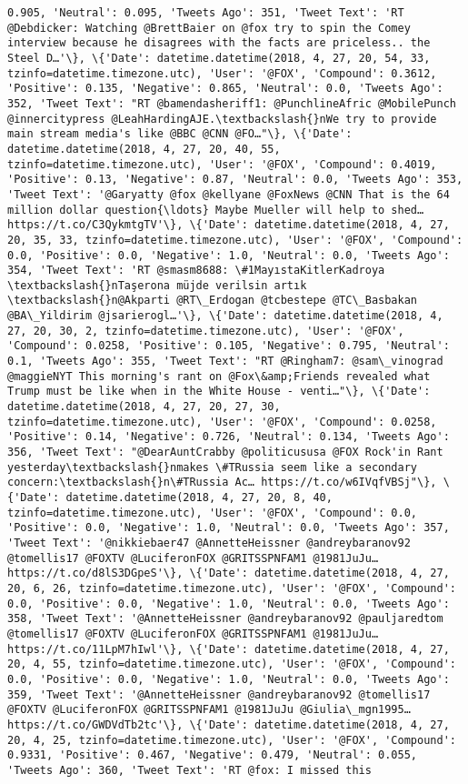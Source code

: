 \documentclass[11pt]{article}
\begin{document}
\begin{Verbatim}[commandchars=\\\{\}]
0.905, 'Neutral': 0.095, 'Tweets Ago': 351, 'Tweet Text': 'RT @Debdicker: Watching @BrettBaier on @fox try to spin the Comey interview because he disagrees with the facts are priceless.. the Steel D…'\}, \{'Date': datetime.datetime(2018, 4, 27, 20, 54, 33, tzinfo=datetime.timezone.utc), 'User': '@FOX', 'Compound': 0.3612, 'Positive': 0.135, 'Negative': 0.865, 'Neutral': 0.0, 'Tweets Ago': 352, 'Tweet Text': "RT @bamendasheriff1: @PunchlineAfric @MobilePunch @innercitypress @LeahHardingAJE.\textbackslash{}nWe try to provide main stream media's like @BBC @CNN @FO…"\}, \{'Date': datetime.datetime(2018, 4, 27, 20, 40, 55, tzinfo=datetime.timezone.utc), 'User': '@FOX', 'Compound': 0.4019, 'Positive': 0.13, 'Negative': 0.87, 'Neutral': 0.0, 'Tweets Ago': 353, 'Tweet Text': '@Garyatty @fox @kellyane @FoxNews @CNN That is the 64 million dollar question{\ldots} Maybe Mueller will help to shed… https://t.co/C3QykmtgTV'\}, \{'Date': datetime.datetime(2018, 4, 27, 20, 35, 33, tzinfo=datetime.timezone.utc), 'User': '@FOX', 'Compound': 0.0, 'Positive': 0.0, 'Negative': 1.0, 'Neutral': 0.0, 'Tweets Ago': 354, 'Tweet Text': 'RT @smasm8688: \#1MayıstaKitlerKadroya \textbackslash{}nTaşerona müjde verilsin artık \textbackslash{}n@Akparti @RT\_Erdogan @tcbestepe @TC\_Basbakan @BA\_Yildirim @jsarierogl…'\}, \{'Date': datetime.datetime(2018, 4, 27, 20, 30, 2, tzinfo=datetime.timezone.utc), 'User': '@FOX', 'Compound': 0.0258, 'Positive': 0.105, 'Negative': 0.795, 'Neutral': 0.1, 'Tweets Ago': 355, 'Tweet Text': "RT @Ringham7: @sam\_vinograd @maggieNYT This morning's rant on @Fox\&amp;Friends revealed what Trump must be like when in the White House - venti…"\}, \{'Date': datetime.datetime(2018, 4, 27, 20, 27, 30, tzinfo=datetime.timezone.utc), 'User': '@FOX', 'Compound': 0.0258, 'Positive': 0.14, 'Negative': 0.726, 'Neutral': 0.134, 'Tweets Ago': 356, 'Tweet Text': "@DearAuntCrabby @politicususa @FOX Rock'in Rant yesterday\textbackslash{}nmakes \#TRussia seem like a secondary concern:\textbackslash{}n\#TRussia Ac… https://t.co/w6IVqfVBSj"\}, \{'Date': datetime.datetime(2018, 4, 27, 20, 8, 40, tzinfo=datetime.timezone.utc), 'User': '@FOX', 'Compound': 0.0, 'Positive': 0.0, 'Negative': 1.0, 'Neutral': 0.0, 'Tweets Ago': 357, 'Tweet Text': '@nikkiebaer47 @AnnetteHeissner @andreybaranov92 @tomellis17 @FOXTV @LuciferonFOX @GRITSSPNFAM1 @1981JuJu… https://t.co/d8lS3DGpeS'\}, \{'Date': datetime.datetime(2018, 4, 27, 20, 6, 26, tzinfo=datetime.timezone.utc), 'User': '@FOX', 'Compound': 0.0, 'Positive': 0.0, 'Negative': 1.0, 'Neutral': 0.0, 'Tweets Ago': 358, 'Tweet Text': '@AnnetteHeissner @andreybaranov92 @pauljaredtom @tomellis17 @FOXTV @LuciferonFOX @GRITSSPNFAM1 @1981JuJu… https://t.co/11LpM7hIwl'\}, \{'Date': datetime.datetime(2018, 4, 27, 20, 4, 55, tzinfo=datetime.timezone.utc), 'User': '@FOX', 'Compound': 0.0, 'Positive': 0.0, 'Negative': 1.0, 'Neutral': 0.0, 'Tweets Ago': 359, 'Tweet Text': '@AnnetteHeissner @andreybaranov92 @tomellis17 @FOXTV @LuciferonFOX @GRITSSPNFAM1 @1981JuJu @Giulia\_mgn1995… https://t.co/GWDVdTb2tc'\}, \{'Date': datetime.datetime(2018, 4, 27, 20, 4, 25, tzinfo=datetime.timezone.utc), 'User': '@FOX', 'Compound': 0.9331, 'Positive': 0.467, 'Negative': 0.479, 'Neutral': 0.055, 'Tweets Ago': 360, 'Tweet Text': 'RT @fox: I missed this 
\end{Verbatim}
\end{document}
